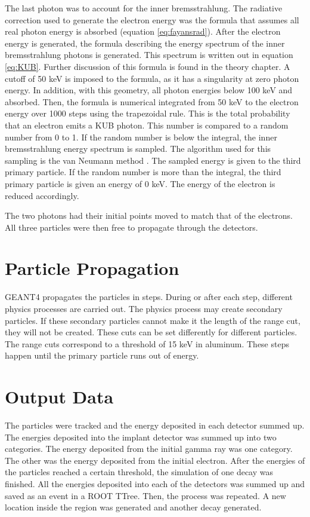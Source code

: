 \documentclass[../MaxHughesThesis.tex]{subfiles}
\begin{document}
The last photon was to account for the inner bremsstrahlung.
The radiative correction used to generate the electron energy was the formula that assumes all real photon energy is absorbed (equation \ref{eq:fayansrad}).
After the electron energy is generated, the formula describing the energy spectrum of the inner bremsstrahlung photons is generated. 
This spectrum is written out in equation \ref{eq:KUB}. %
Further discussion of this formula is found in the theory chapter.
A cutoff of 50 keV is imposed to the formula, as it has a singularity at zero photon energy.
In addition, with this geometry, all photon energies below 100 keV and absorbed.
Then, the formula is numerical integrated from 50 keV to the electron energy over 1000 steps using the trapezoidal rule.
This is the total probability that an electron emits a KUB photon.
This number is compared to a random number from 0 to 1.
If the random number is below the integral, the inner bremsstrahlung energy spectrum is sampled.
The algorithm used for this sampling is the van Neumann method \cite{neu51}.
The sampled energy is given to the third primary particle.
If the random number is more than the integral, the third primary particle is given an energy of 0 keV.
The energy of the electron is reduced accordingly.

The two photons had their initial points moved to match that of the electrons.
All three particles were then free to propagate through the detectors.

\section{Particle Propagation}  
GEANT4 propagates the particles in steps.
During or after each step, different physics processes are carried out.
The physics process may create secondary particles.
If these secondary particles cannot make it the length of the range cut, they will not be created.
These cuts can be set differently for different particles.
The range cuts correspond to a threshold of 15 keV in aluminum.
These steps happen until the primary particle runs out of energy.

\section{Output Data}
The particles were tracked and the energy deposited in each detector summed up.
The energies deposited into the implant detector was summed up into two categories.
The energy deposited from the initial gamma ray was one category.
The other was the energy deposited from the initial electron.
After the energies of the particles reached a certain threshold, the simulation of one decay was finished.
All the energies deposited into each of the detectors was summed up and saved as an event in a ROOT TTree.
Then, the process was repeated.
A new location inside the region was generated and another decay generated.
\end{document}
